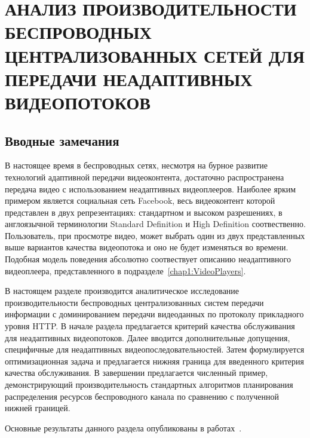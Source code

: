 \chapter{АНАЛИЗ ПРОИЗВОДИТЕЛЬНОСТИ БЕСПРОВОДНЫХ ЦЕНТРАЛИЗОВАННЫХ СЕТЕЙ ДЛЯ ПЕРЕДАЧИ НЕАДАПТИВНЫХ ВИДЕОПОТОКОВ}
\label{chap3}

\section{Вводные замечания}
\label{chap3:Intro}
В настоящее время в беспроводных сетях, несмотря на бурное развитие технологий адаптивной передачи видеоконтента, достаточно распространена передача видео с использованием неадаптивных видеоплееров. Наиболее ярким примером является социальная сеть Facebook, весь видеоконтент которой представлен в двух репрезентациях: стандартном и высоком разрешениях, в англоязычной терминологии Standard Definition и High Definition соотвественно. Пользователь, при просмотре видео, может выбрать один из двух представленных выше вариантов качества видеопотока и оно не будет изменяться во времени. Подобная модель поведения абсолютно соотвествует описанию неадаптивного видеоплеера, представленного в подразделе~\ref{chap1:VideoPlayers}.

В настоящем разделе производится аналитическое исследование производительности беспроводных централизованных систем передачи информации с доминированием передачи видеоданных по протоколу прикладного уровня HTTP. В начале раздела предлагается критерий качества обслуживания для неадаптивных видеопотоков. Далее вводится дополнительные допущения, специфичные для неадаптивных видеопоследовательностей. Затем формулируется оптимизационная задача и предлагается нижняя граница для введенного критерия качества обслуживания. В завершении предлагается численный пример, демонстрирующий производительность стандартных алгоритмов планирования распределения ресурсов беспроводного канала по сравнению с полученной нижней границей.

Основные результаты данного раздела опубликованы в работах~\cite{past_tur,Suai2017}.

